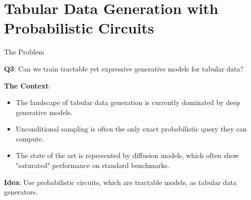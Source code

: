 \section{Tabular Data Generation with Probabilistic Circuits}


\begin{frame}[fragile]{The Problem}

    \textbf{Q3}: Can we train tractable yet expressive generative models for tabular data?
    \bigskip

    \textbf{The Context}:
    \begin{itemize}
        \item The landscape of tabular data generation is currently dominated by deep generative models.
        \item Unconditional sampling is often the only exact probabilistic query they can compute.
        \item The state of the art is represented by diffusion models, which often show "saturated" performance on standard benchmarks.
    \end{itemize}

    \textbf{Idea}: Use probabilistic circuits, which are tractable models, as tabular data generators.


    
\end{frame}



    
